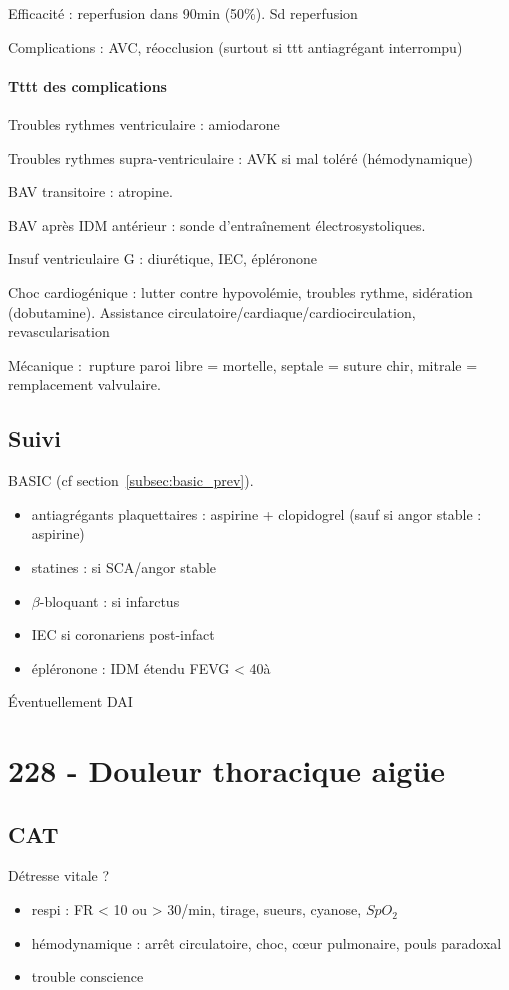 Efficacité : reperfusion dans 90min (50\%). Sd reperfusion

Complications : AVC, réocclusion (surtout si ttt antiagrégant interrompu)

\paragraph{Tttt des complications}
Troubles rythmes ventriculaire : amiodarone

Troubles rythmes supra-ventriculaire : AVK si mal toléré (hémodynamique)

BAV transitoire : atropine.

BAV après IDM antérieur : sonde d'entraînement électrosystoliques.

Insuf ventriculaire G : diurétique, IEC, épléronone

Choc cardiogénique : lutter contre {hypovolémie, troubles rythme}, sidération
(dobutamine). Assistance circulatoire/cardiaque/cardiocirculation,
revascularisation

Mécanique : rupture paroi libre = mortelle, septale = suture chir, mitrale =
remplacement valvulaire.

\subsection{Suivi} BASIC (cf section~\ref{subsec:basic_prev}).
\begin{itemize}
  \item antiagrégants plaquettaires : aspirine + clopidogrel (sauf si angor
    stable : aspirine)
  \item statines : si SCA/angor stable
  \item $\beta$-bloquant : si infarctus
  \item IEC si coronariens post-infact
  \item épléronone : IDM étendu FEVG < 40à%
\end{itemize}
Éventuellement DAI

\section{228 - Douleur thoracique aigüe}%
\label{sec:228_douleur_thoracique_aigue}

\subsection{CAT}
Détresse vitale ?
\begin{itemize}
  \item respi : FR < 10 ou > 30/min, tirage, sueurs, cyanose, $SpO_2$
  \item hémodynamique : arrêt circulatoire, choc, c\oe{}ur pulmonaire, pouls
    paradoxal
  \item trouble conscience
\end{itemize}

